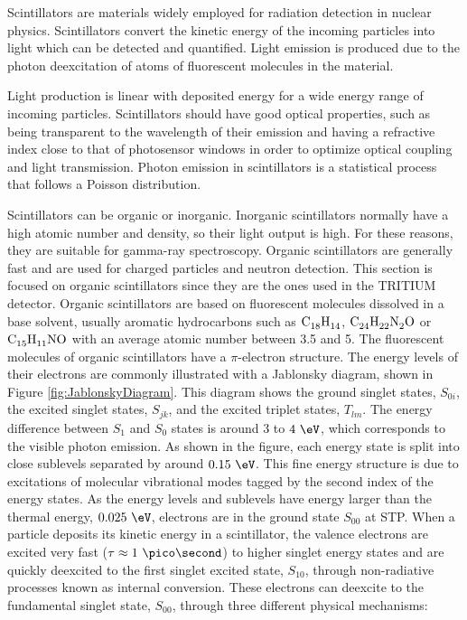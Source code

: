 Scintillators are materials widely employed for radiation detection in nuclear physics. Scintillators convert the kinetic energy of the incoming particles into light which can be detected and quantified. Light emission is produced due to the photon deexcitation of atoms of fluorescent molecules in the material.

Light production is linear with deposited energy for a wide energy range of incoming particles. Scintillators should have good optical properties, such as being transparent to the wavelength of their emission and having a refractive index close to that of photosensor windows in order to optimize optical coupling and light transmission. Photon emission in scintillators is a statistical process that follows a Poisson distribution.

Scintillators can be organic or inorganic. Inorganic scintillators normally have a high atomic number and density, so their light output is high. For these reasons, they are suitable for gamma-ray spectroscopy. Organic scintillators are generally fast and are used for charged particles and neutron detection. This section is focused on organic scintillators since they are the ones used in the TRITIUM detector. Organic scintillators are based on fluorescent molecules dissolved in a base solvent, usually aromatic hydrocarbons such as $\ce{C_{18}H_{14}}$, $\ce{C_{24}H_{22}N_{2}O}$ or $\ce{C_{15}H_{11}NO}$ with an average atomic number between 3.5 and 5. The fluorescent molecules of organic scintillators have a $\pi$-electron structure. The energy levels of their electrons are commonly illustrated with a Jablonsky diagram, shown in Figure \ref{fig:JablonskyDiagram}. This diagram shows the ground singlet states, $S_{0i}$, the excited singlet states, $S_{jk}$, and the excited triplet states, $T_{lm}$. The energy difference between $S_1$ and $S_0$ states is around $3$ to $4~\eV$, which corresponds to the visible photon emission. As shown in the figure, each energy state is split into close sublevels separated by around $0.15~\eV$. This fine energy structure is due to excitations of molecular vibrational modes tagged by the second index of the energy states. As the energy levels and sublevels have energy larger than the thermal energy, $0.025~\eV$, electrons are in the ground state $S_{00}$ at STP. When a particle deposits its kinetic energy in a scintillator, the valence electrons are excited very fast ($\tau \approx 1~\pico\second$) to higher singlet energy states and are quickly deexcited to the first singlet excited state, $S_{10}$, through non-radiative processes known as internal conversion. These electrons can deexcite to the fundamental singlet state, $S_{00}$, through three different physical mechanisms:

